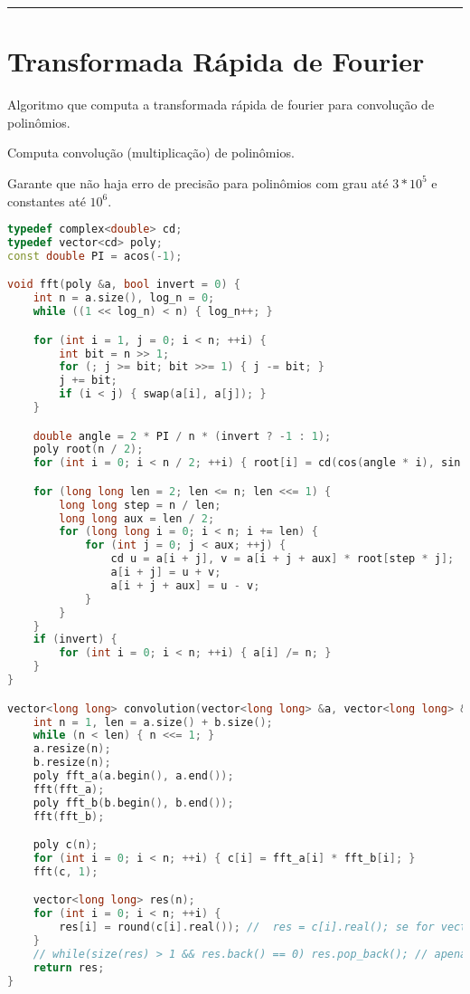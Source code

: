\documentclass[11pt, a4paper, twoside]{book}
\begin{document}
\hfill

\rule{\textwidth}{0.4pt}

\section{Transformada Rápida de Fourier}



Algoritmo que computa a transformada rápida de fourier para convolução de polinômios.



Computa convolução (multiplicação) de polinômios.





Garante que não haja erro de precisão para polinômios com grau até $3 * 10^5$ e constantes até $10^6$.

\hfill

\begin{lstlisting}[language=C++]
typedef complex<double> cd;
typedef vector<cd> poly;
const double PI = acos(-1);

void fft(poly &a, bool invert = 0) {
    int n = a.size(), log_n = 0;
    while ((1 << log_n) < n) { log_n++; }

    for (int i = 1, j = 0; i < n; ++i) {
        int bit = n >> 1;
        for (; j >= bit; bit >>= 1) { j -= bit; }
        j += bit;
        if (i < j) { swap(a[i], a[j]); }
    }

    double angle = 2 * PI / n * (invert ? -1 : 1);
    poly root(n / 2);
    for (int i = 0; i < n / 2; ++i) { root[i] = cd(cos(angle * i), sin(angle * i)); }

    for (long long len = 2; len <= n; len <<= 1) {
        long long step = n / len;
        long long aux = len / 2;
        for (long long i = 0; i < n; i += len) {
            for (int j = 0; j < aux; ++j) {
                cd u = a[i + j], v = a[i + j + aux] * root[step * j];
                a[i + j] = u + v;
                a[i + j + aux] = u - v;
            }
        }
    }
    if (invert) {
        for (int i = 0; i < n; ++i) { a[i] /= n; }
    }
}

vector<long long> convolution(vector<long long> &a, vector<long long> &b) {
    int n = 1, len = a.size() + b.size();
    while (n < len) { n <<= 1; }
    a.resize(n);
    b.resize(n);
    poly fft_a(a.begin(), a.end());
    fft(fft_a);
    poly fft_b(b.begin(), b.end());
    fft(fft_b);

    poly c(n);
    for (int i = 0; i < n; ++i) { c[i] = fft_a[i] * fft_b[i]; }
    fft(c, 1);

    vector<long long> res(n);
    for (int i = 0; i < n; ++i) {
        res[i] = round(c[i].real()); //  res = c[i].real(); se for vector de double
    }
    // while(size(res) > 1 && res.back() == 0) res.pop_back(); // apenas para quando os zeros direita nao importarem
    return res;
}
\end{lstlisting}
\end{document}
